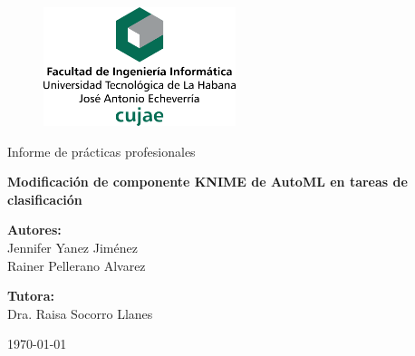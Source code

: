 \begin{figure}
	\centering
	\includegraphics[width=0.5\textwidth]{figuras/membrete-cujae-centrado.png}
\end{figure}

	\begin{center}
		
	\vspace{2cm}

	
	
	\large{Informe de prácticas profesionales}

	\vspace{3cm}
	

	\LARGE{\textbf{Modificación de componente KNIME de AutoML en tareas de clasificación}}
	
	
	
	\vspace{2cm}
	
	\large{
	\textbf{Autores:} \\
	Jennifer Yanez Jiménez\\
	Rainer Pellerano Alvarez\\
	\vspace{1.5cm}
	
	\textbf{Tutora:}\\
	Dra. Raisa Socorro Llanes\\
	}
	
	\vspace{2cm}
	
	{\mifecha\today}
	
\end{center}	


